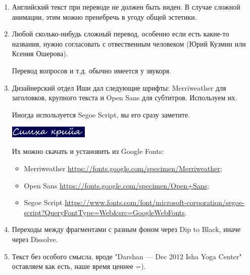 \documentclass[
a4paper, %
12pt, %
article,
onecolumn, %
openany, %
]{memoir}
\begin{document}
\begin{enumerate}
\item Английский текст при переводе не должен быть виден. В случае сложной анимации, этим можно пренебречь в угоду общей эстетики.

\item Любой сколько-нибудь сложный перевод, особенно если есть какие-то названия, нужно согласовать с отвественным человеком (Юрий Кузмин или Ксения Ошерова).

	Перевод вопросов и т.д. обычно имеется у звукоря.

\item Дизайнерский отдел Иши дал следующие шрифты: Merriweather для заголовков, крупного текста и Open Sans для субтитров. Используем их.

    Иногда используется Segoe Script, вы его сразу заметите.

 \includegraphics[width=0.3\textwidth]{segoeScript}

    Их можно скачать и установить из Google Fonts:
    \begin{itemize}
        \item  Merriweather \href{https://fonts.google.com/specimen/Merriweather}{\small https://fonts.google.com/specimen/Merriweather};
        \item Open Sans \href{https://fonts.google.com/specimen/Open+Sans}{\small https://fonts.google.com/specimen/Open+Sans};
    \item Segoe Script \href{https://www.fonts.com/font/microsoft-corporation/segoe-script?QueryFontType=Web&src=GoogleWebFonts}{\small https://www.fonts.com/font/microsoft-corporation/segoe-script?QueryFontType=Web\&src=GoogleWebFonts}.
      \end{itemize}


\item Переходы между фрагментами с разным фоном через Dip to Black, иначе через Dissolve.

\item Текст без особого смысла, вроде "Darshan — Dec 2012
   Isha Yoga Center" оставляем как есть, наше время ценнее =).
\end{enumerate}
\end{document}
